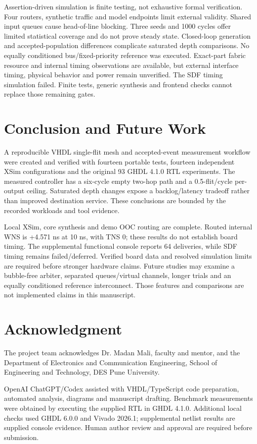 \documentclass[conference,a4paper]{IEEEtran}
\begin{document}
Assertion-driven simulation is finite testing, not exhaustive formal verification. Four routers, synthetic traffic and model endpoints limit external validity. Shared input queues cause head-of-line blocking. Three seeds and 1000 cycles offer limited statistical coverage and do not prove steady state. Closed-loop generation and accepted-population differences complicate saturated depth comparisons. No equally conditioned bus/fixed-priority reference was executed. Exact-part fabric resource and internal timing observations are available, but external interface timing, physical behavior and power remain unverified. The SDF timing simulation failed. Finite tests, generic synthesis and frontend checks cannot replace those remaining gates.
\section{Conclusion and Future Work}
A reproducible VHDL single-flit mesh and accepted-event measurement workflow were created and verified with fourteen portable tests, fourteen independent XSim configurations and the original 93 GHDL 4.1.0 RTL experiments. The measured controller has a six-cycle empty two-hop path and a 0.5-flit/cycle per-output ceiling. Saturated depth changes expose a backlog/latency tradeoff rather than improved destination service. These conclusions are bounded by the recorded workloads and tool evidence.

Local XSim, core synthesis and demo OOC routing are complete. Routed internal WNS is +4.571 ns at 10 ns, with TNS 0; these results do not establish board timing. The supplemental functional console reports 64 deliveries, while SDF timing remains failed/deferred. Verified board data and resolved simulation limits are required before stronger hardware claims. Future studies may examine a bubble-free arbiter, separated queues/virtual channels, longer trials and an equally conditioned reference interconnect. Those features and comparisons are not implemented claims in this manuscript.
\section*{Acknowledgment}
The project team acknowledges Dr. Madan Mali, faculty and mentor, and the Department of Electronics and Communication Engineering, School of Engineering and Technology, DES Pune University.

OpenAI ChatGPT/Codex assisted with VHDL/TypeScript code preparation, automated analysis, diagrams and manuscript drafting. Benchmark measurements were obtained by executing the supplied RTL in GHDL 4.1.0. Additional local checks used GHDL 6.0.0 and Vivado 2026.1; supplemental netlist results are supplied console evidence. Human author review and approval are required before submission.


\end{document}

